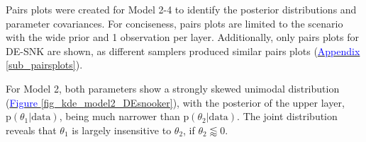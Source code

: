 Pairs plots were created for Model 2-4 to identify the posterior distributions and parameter covariances. For conciseness, pairs plots are limited to the scenario with the wide prior and 1 observation per layer. Additionally, only pairs plots for DE-SNK are shown, as different samplers produced similar pairs plots (\hyperref[additional_results]{\textcolor{blue}{Appendix }\ref{sub_pairsplots}}).  

For Model 2, both parameters show a strongly skewed unimodal distribution (\hyperref[fig_kde_model2_DEsnooker]{\textcolor{blue}{Figure }\ref{fig_kde_model2_DEsnooker}}), with the posterior of the upper layer, $\text{p}(\theta_1 | \text{data})$, being much narrower than $\text{p}(\theta_2 | \text{data})$. The joint distribution reveals that $\theta_1$ is largely insensitive to $\theta_2$, if $\theta_2 \lessapprox 0$.  


